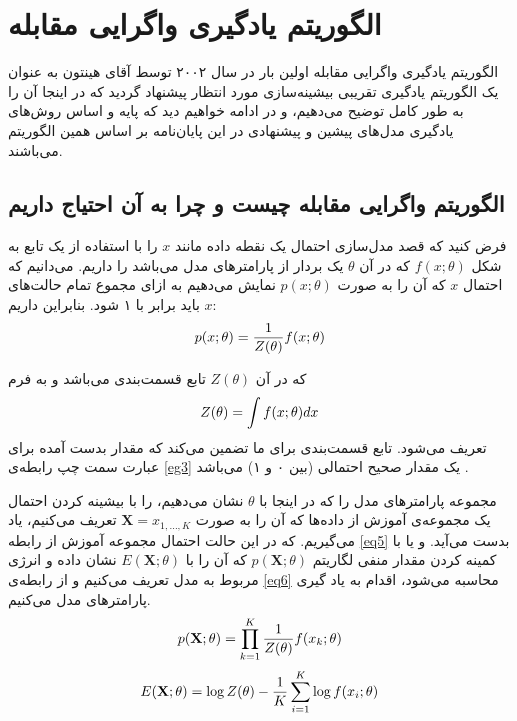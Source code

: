 \section{الگوریتم یادگیری واگرایی مقابله}
\label{chap2sec7}
الگوریتم یادگیری واگرایی مقابله
 اولین بار در سال ۲۰۰۲ توسط آقای هینتون
\cite{hinton2002training}
به عنوان یک الگوریتم یادگیری تقریبی بیشینه‌سازی مورد انتظار
پیشنهاد گردید که در اینجا آن را به طور کامل توضیح می‌‌دهیم، و در ادامه خواهیم دید که پایه و اساس روش‌های یادگیری مدل‌های پیشین و پیشنهادی در این پایان‌‌نامه بر اساس همین الگوریتم می‌‌باشند.

\subsection{الگوریتم واگرایی مقابله چیست و چرا به آن احتیاج داریم}
\label{chap2sec7sub1}

فرض کنید که قصد مدل‌سازی احتمال یک نقطه داده
 مانند
$x$
را با استفاده از یک تابع به شکل
$f(x;\theta)$
که در آن
$\theta$
یک بردار از پارامتر‌های مدل می‌‌باشد را داریم. می‌‌دانیم که احتمال
$x$
که آن را به صورت
$p(x;\theta)$
نمایش می‌‌دهیم به ازای مجموع تمام حالت‌های
$x$
باید برابر با ۱ شود. بنابراین داریم:
\begin{align}
\centering
p(x;\theta) = \dfrac{1}{Z(\theta)}f(x;\theta)
\label{eg3}
\end{align}

که در آن
$Z(\theta)$
تابع قسمت‌بندی
 می‌‌باشد و به فرم
\begin{align}
\centering
Z(\theta) = \int f(x;\theta)dx
\label{eg4}
\end{align}
تعریف می‌شود. تابع قسمت‌بندی برای ما تضمین می‌‌کند که مقدار بدست آمده برای عبارت سمت چپ رابطه‌ی
\ref{eg3}
یک مقدار صحیح احتمالی‌ (بین ۰ و ۱) می‌‌باشد
\cite{woodfordnotes}.

مجموعه پارامتر‌های مدل را که در اینجا با
$\theta$
نشان می‌‌دهیم، را با بیشینه کردن احتمال یک مجموعه‌‌ی آموزش
 از داده‌ها که آن را به صورت
$\textbf{X} = x_{1,...,K}$
تعریف می‌‌کنیم، یاد می‌‌گیریم. که در این حالت احتمال مجموعه آموزش از رابطه
\ref{eq5}
بدست می‌‌آید. و یا با کمینه کردن مقدار منفی لگاریتم
$p(\textbf{X};\theta)$
که آن را با
$E(\textbf{X};\theta)$
نشان داده و انرژی مربوط به مدل تعریف می‌کنیم و از رابطه‌ی 
\ref{eq6}
محاسبه می‌شود، اقدام به یاد گیری پارامتر‌های مدل می‌‌کنیم.
\begin{align}
\centering
p(\textbf{X};\theta) = \prod_{k=1}^{K} \frac{1}{Z(\theta)} f(x_k;\theta)
\label{eq5}
\end{align}
\begin{align}
\centering
E(\textbf{X};\theta) = \log Z(\theta) - \dfrac{1}{K} \sum_{i=1}^{K} \log f(x_i;\theta)
\label{eq6}
\end{align}

